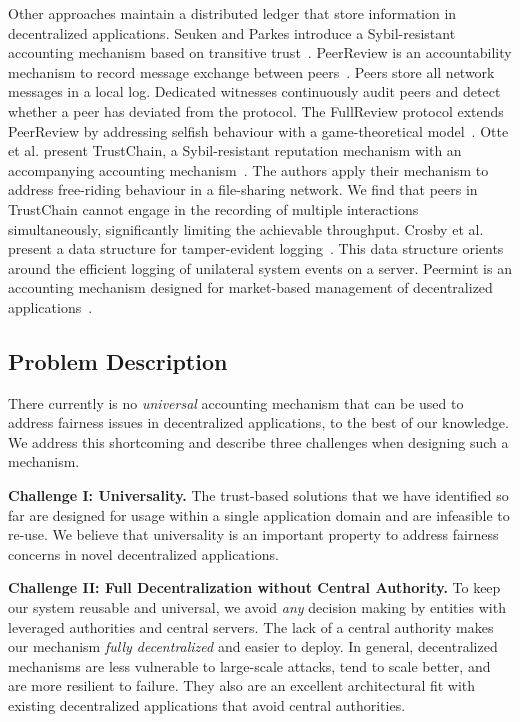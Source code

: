 Other approaches maintain a distributed ledger that store information in decentralized applications.
Seuken and Parkes introduce a Sybil-resistant accounting mechanism based on transitive trust~\cite{seuken2014sybil}.
PeerReview is an accountability mechanism to record message exchange between peers~\cite{haeberlen2007peerreview}.
Peers store all network messages in a local log.
Dedicated witnesses continuously audit peers and detect whether a peer has deviated from the protocol.
The FullReview protocol extends PeerReview by addressing selfish behaviour with a game-theoretical model~\cite{diarra2014fullreview}.
Otte et al. present TrustChain, a Sybil-resistant reputation mechanism with an accompanying accounting mechanism~\cite{otte2017trustchain}.
The authors apply their mechanism to address free-riding behaviour in a file-sharing network.
We find that peers in TrustChain cannot engage in the recording of multiple interactions simultaneously, significantly limiting the achievable throughput.
Crosby et al. present a data structure for tamper-evident logging~\cite{crosby2009efficient}.
This data structure orients around the efficient logging of unilateral system events on a server.
Peermint is an accounting mechanism designed for market-based management of decentralized applications~\cite{hausheer2005peermint}.

\subsection{Problem Description}
\label{sec:problem_description}
There currently is no \emph{universal} accounting mechanism that can be used to address fairness issues in decentralized applications, to the best of our knowledge.
We address this shortcoming and describe three challenges when designing such a mechanism.

\textbf{Challenge I: Universality.}
The trust-based solutions that we have identified so far are designed for usage within a single application domain and are infeasible to re-use.
We believe that universality is an important property to address fairness concerns in novel decentralized applications.

\textbf{Challenge II: Full Decentralization without Central Authority.}
To keep our system reusable and universal, we avoid \emph{any} decision making by entities with leveraged authorities and central servers.
The lack of a central authority makes our mechanism \emph{fully decentralized} and easier to deploy.
In general, decentralized mechanisms are less vulnerable to large-scale attacks, tend to scale better, and are more resilient to failure.
They also are an excellent architectural fit with existing decentralized applications that avoid central authorities.

